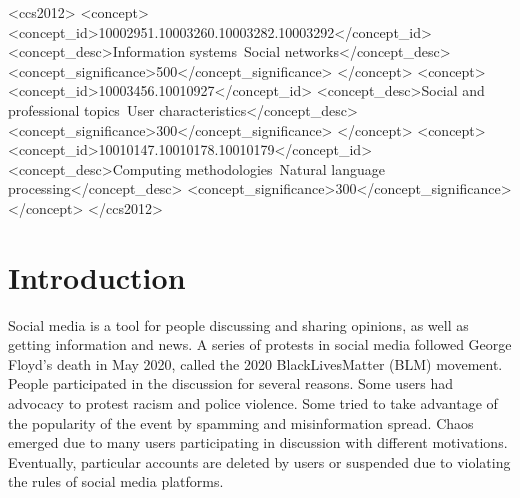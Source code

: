 \documentclass[sigconf]{acmart}
\begin{document}
\begin{CCSXML}
<ccs2012>
   <concept>
       <concept_id>10002951.10003260.10003282.10003292</concept_id>
       <concept_desc>Information systems~Social networks</concept_desc>
       <concept_significance>500</concept_significance>
       </concept>
   <concept>
       <concept_id>10003456.10010927</concept_id>
       <concept_desc>Social and professional topics~User characteristics</concept_desc>
       <concept_significance>300</concept_significance>
       </concept>
    <concept>
        <concept_id>10010147.10010178.10010179</concept_id>
        <concept_desc>Computing methodologies~Natural language processing</concept_desc>
        <concept_significance>300</concept_significance>
    </concept>
</ccs2012>
\end{CCSXML}




\maketitle
\section{Introduction}\label{section:intro}

Social media is a tool for people discussing and sharing opinions, as well as getting information and news. A series of protests in social media followed George Floyd's death in May 2020, called the 2020 BlackLivesMatter (BLM) movement. People participated in the discussion for several reasons. Some users had advocacy to protest racism and police violence. Some tried to take advantage of the popularity of the event by spamming and misinformation spread. Chaos emerged due to many users participating in discussion with different motivations. Eventually, particular accounts are deleted by users or suspended due to violating the rules of social media platforms.
\end{document}
